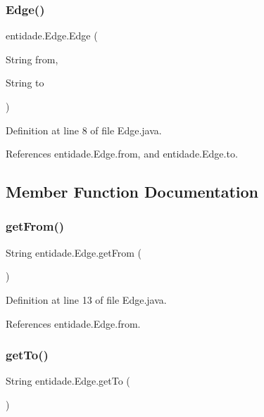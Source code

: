 \subsubsection{\texorpdfstring{Edge()}{Edge()}}
{\footnotesize\ttfamily entidade.\+Edge.\+Edge (\begin{DoxyParamCaption}\item[{String}]{from,  }\item[{String}]{to }\end{DoxyParamCaption})}



Definition at line 8 of file Edge.\+java.



References entidade.\+Edge.\+from, and entidade.\+Edge.\+to.



\subsection{Member Function Documentation}
\hypertarget{classentidade_1_1Edge_aa6fdf62a95dc0c9d25b61abfd832041b}{}\label{classentidade_1_1Edge_aa6fdf62a95dc0c9d25b61abfd832041b} 
\subsubsection{\texorpdfstring{get\+From()}{getFrom()}}
{\footnotesize\ttfamily String entidade.\+Edge.\+get\+From (\begin{DoxyParamCaption}{ }\end{DoxyParamCaption})}



Definition at line 13 of file Edge.\+java.



References entidade.\+Edge.\+from.

\hypertarget{classentidade_1_1Edge_aa068ecd10ba33f29120b7b935a44c488}{}\label{classentidade_1_1Edge_aa068ecd10ba33f29120b7b935a44c488} 
\subsubsection{\texorpdfstring{get\+To()}{getTo()}}
{\footnotesize\ttfamily String entidade.\+Edge.\+get\+To (\begin{DoxyParamCaption}{ }\end{DoxyParamCaption})}



